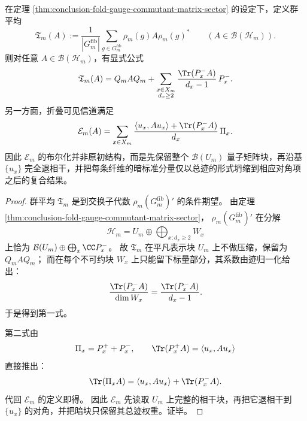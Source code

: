 \begin{theorem}[可见布尔读出是矩阵扇区退相干与暗多重度坍缩的复合]\label{thm:conclusion-fold-gauge-average-visible-decoherence}
在定理 \ref{thm:conclusion-fold-gauge-commutant-matrix-sector} 的设定下，定义群平均
\[
\mathfrak T_m(A):=\frac{1}{|G_m^{\mathrm{fib}}|}\sum_{g\in G_m^{\mathrm{fib}}}\rho_m(g)A\rho_m(g)^*
\qquad
(A\in \mathcal B(\mathcal H_m)).
\]
则对任意 \(A\in\mathcal B(\mathcal H_m)\)，有显式公式
\[
\mathfrak T_m(A)
=
Q_mAQ_m
+\sum_{\substack{x\in X_m\\ d_x\ge 2}}
\frac{\Tr(P_x^-A)}{d_x-1}\,P_x^-.
\]
另一方面，折叠可见信道满足
\[
\mathcal E_m(A)
=
\sum_{x\in X_m}
\frac{\langle u_x,Au_x\rangle+\Tr(P_x^-A)}{d_x}\,\Pi_x.
\]
因此 \(\mathcal E_m\) 的布尔化并非原初结构，而是先保留整个 \(\mathcal B(U_m)\) 量子矩阵块，再沿基 \(\{u_x\}\) 完全退相干，并把每条纤维的暗标准分量仅以总迹的形式坍缩到相应对角项之后的复合结果。
\end{theorem}
\begin{proof}
群平均 \(\mathfrak T_m\) 是到交换子代数 \(\rho_m(G_m^{\mathrm{fib}})'\) 的条件期望。
由定理 \ref{thm:conclusion-fold-gauge-commutant-matrix-sector}，
\(\rho_m(G_m^{\mathrm{fib}})'\) 在分解
\[
\mathcal H_m=U_m\oplus \bigoplus_{x:d_x\ge 2}W_x
\]
上恰为
\(
\mathcal B(U_m)\oplus \bigoplus_x \CC P_x^-
\)。
故 \(\mathfrak T_m\) 在平凡表示块 \(U_m\) 上不做压缩，保留为 \(Q_mAQ_m\)；
而在每个不可约块 \(W_x\) 上只能留下标量部分，其系数由迹归一化给出：
\[
\frac{\Tr(P_x^-A)}{\dim W_x}
=
\frac{\Tr(P_x^-A)}{d_x-1}.
\]
于是得到第一式。

第二式由
\[
\Pi_x=P_x^++P_x^-,
\qquad
\Tr(P_x^+A)=\langle u_x,Au_x\rangle
\]
直接推出：
\[
\Tr(\Pi_xA)=\langle u_x,Au_x\rangle+\Tr(P_x^-A).
\]
代回 \(\mathcal E_m\) 的定义即得。
因此 \(\mathcal E_m\) 先读取 \(U_m\) 上完整的相干块，再把它退相干到 \(\{u_x\}\) 的对角，并把暗块只保留其总迹权重。证毕。
\end{proof}



